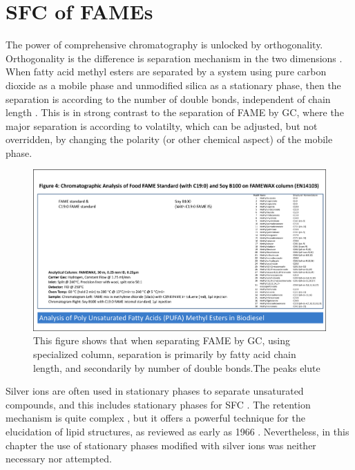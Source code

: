 \section{SFC of FAMEs}

The power of comprehensive chromatography is unlocked by orthogonality.
Orthogonality is the difference is separation mechanism in the two dimensions
. When fatty acid methyl esters are separated
by a system using pure carbon dioxide as a mobile phase and unmodified silica as
a stationary phase, then the separation is according to the number of double
bonds, independent of chain length \autocite{Robertson1991, Smith1994,
Smith2001}. This is in strong contrast to the separation of FAME by GC, where
the major separation is according to volatilty, which can be adjusted, but not
overridden, by changing the polarity (or other chemical aspect) of the mobile
phase.

\begin{figure}
\centering
\includegraphics[width=\textwidth]{Figures/FAME-GC.pdf}
\decoRule

\caption[Separation of FAME by GC]{This figure shows that when separating FAME
by GC, using specialized column, separation is primarily by fatty acid chain
length, and secondarily by number of double bonds.The peaks elute }

\label{fig:co2fill}
\end{figure}

Silver ions are often used in stationary phases to separate unsaturated
compounds, and this includes stationary phases for SFC \autocite{Sandra2002,
Potgieter2013}. The retention mechanism is quite complex
\autocite{Nikolova-Damyanova2019}, but it offers a powerful technique for the
elucidation of lipid structures, as reviewed as early as 1966
\autocite{Morris1966}. Nevertheless, in this chapter the use of stationary
phases modified with silver ions was neither necessary nor attempted.

